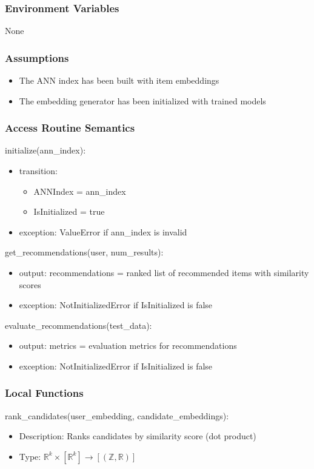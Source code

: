 \documentclass[12pt, titlepage]{article}
\begin{document}
\subsubsection{Environment Variables}

None

\subsubsection{Assumptions}

\begin{itemize}
  \item The ANN index has been built with item embeddings
  \item The embedding generator has been initialized with trained models
\end{itemize}

\subsubsection{Access Routine Semantics}

\noindent initialize(ann\_index):
\begin{itemize}
  \item transition:
  \begin{itemize}
    \item ANNIndex = ann\_index
    \item IsInitialized = true
  \end{itemize}
\item exception: ValueError if ann\_index is invalid
\end{itemize}

\noindent get\_recommendations(user, num\_results):
\begin{itemize}
\item output: recommendations = ranked list of recommended items with similarity scores
\item exception: NotInitializedError if IsInitialized is false
\end{itemize}

\noindent evaluate\_recommendations(test\_data):
\begin{itemize}
\item output: metrics = evaluation metrics for recommendations
\item exception: NotInitializedError if IsInitialized is false
\end{itemize}
\subsubsection{Local Functions}
rank\_candidates(user\_embedding, candidate\_embeddings):
\begin{itemize}
  \item Description: Ranks candidates by similarity score (dot product)
  \item Type: $\mathbb{R}^k \times [\mathbb{R}^k] \rightarrow [(\mathbb{Z},\mathbb{R})]$
\end{itemize}
\end{document}
